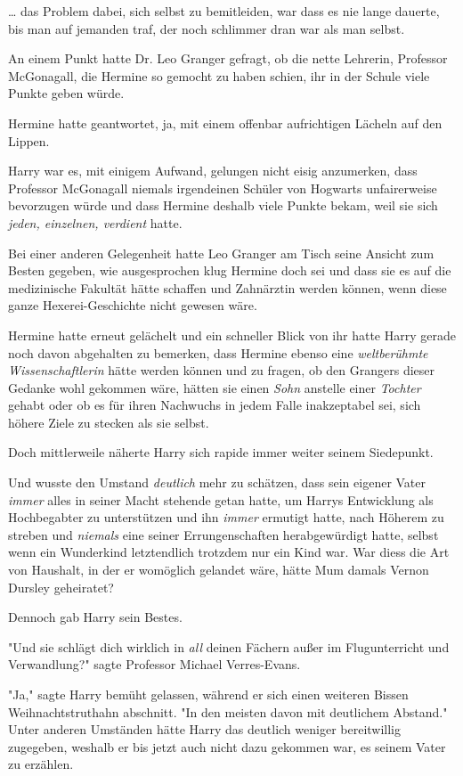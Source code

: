 {… das Problem dabei, sich selbst zu bemitleiden, war dass es nie lange dauerte, bis man auf jemanden traf, der noch schlimmer dran war als man selbst.

An einem Punkt hatte Dr. Leo Granger gefragt, ob die nette Lehrerin, Professor McGonagall, die Hermine so gemocht zu haben schien, ihr in der Schule viele Punkte geben würde.

Hermine hatte geantwortet, ja, mit einem offenbar aufrichtigen Lächeln auf den Lippen.

Harry war es, mit einigem Aufwand, gelungen nicht eisig anzumerken, dass Professor McGonagall niemals irgendeinen Schüler von Hogwarts unfairerweise bevorzugen würde und dass Hermine deshalb viele Punkte bekam, weil sie sich \emph{jeden, einzelnen, verdient} hatte.

Bei einer anderen Gelegenheit hatte Leo Granger am Tisch seine Ansicht zum Besten gegeben, wie ausgesprochen klug Hermine doch sei und dass sie es auf die medizinische Fakultät hätte schaffen und Zahnärztin werden können, wenn diese ganze Hexerei-Geschichte nicht gewesen wäre.

Hermine hatte erneut gelächelt und ein schneller Blick von ihr hatte Harry gerade noch davon abgehalten zu bemerken, dass Hermine ebenso eine \emph{weltberühmte Wissenschaftlerin} hätte werden können und zu fragen, ob den Grangers dieser Gedanke wohl gekommen wäre, hätten sie einen \emph{Sohn} anstelle einer \emph{Tochter} gehabt oder ob es für ihren Nachwuchs in jedem Falle inakzeptabel sei, sich höhere Ziele zu stecken als sie selbst.

Doch mittlerweile näherte Harry sich rapide immer weiter seinem Siedepunkt.

Und wusste den Umstand \emph{deutlich} mehr zu schätzen, dass sein eigener Vater \emph{immer} alles in seiner Macht stehende getan hatte, um Harrys Entwicklung als Hochbegabter zu unterstützen und ihn \emph{immer} ermutigt hatte, nach Höherem zu streben und \emph{niemals} eine seiner Errungenschaften herabgewürdigt hatte, selbst wenn ein Wunderkind letztendlich trotzdem nur ein Kind war. War diess die Art von Haushalt, in der er womöglich gelandet wäre, hätte Mum damals Vernon Dursley geheiratet?

Dennoch gab Harry sein Bestes.

"Und sie schlägt dich wirklich in \emph{all} deinen Fächern außer im Flugunterricht und Verwandlung?" sagte Professor Michael Verres-Evans.

"Ja," sagte Harry bemüht gelassen, während er sich einen weiteren Bissen Weihnachtstruthahn abschnitt. "In den meisten davon mit deutlichem Abstand." Unter anderen Umständen hätte Harry das deutlich weniger bereitwillig zugegeben, weshalb er bis jetzt auch nicht dazu gekommen war, es seinem Vater zu erzählen.

}
